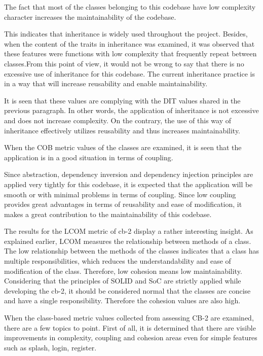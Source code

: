 The fact that most of the classes belonging to this codebase have low complexity character increases the maintainability of the codebase.

This indicates that inheritance is widely used throughout the project.
Besides, when the content of the traits in inheritance was examined, it was observed that these features were functions with low complexity that frequently repeat between classes.From this point of view, it would not be wrong to say that there is no excessive use of inheritance for this codebase. The current inheritance practice is in a way that will increase reusability and enable maintainability.

It is seen that these values are complying with the DIT values shared in the previous paragraph. In other words, the application of inheritance is not excessive and does not increase complexity. On the contrary, the use of this way of inheritance effectively utilizes reusability and thus increases maintainability.

When the COB metric values of the classes are examined, it is seen that the application is in a good situation in terms of coupling. 

Since abstraction, dependency inversion and dependency injection principles are applied very tightly for this codebase, it is expected that the application will be smooth or with minimal problems in terms of coupling. Since low coupling provides great advantages in terms of reusability and ease of modification, it makes a great contribution to the maintainability of this codebase.

The results for the LCOM metric of cb-2 display a rather interesting insight.
As explained earlier, LCOM measures the relationship between methods of a class. The low relationship between the methods of the classes indicates that a class has multiple responsibilities, which reduces the understandability and ease of modification of the class. Therefore, low cohesion means low maintainability. Considering that the principles of SOLID and SoC are strictly applied while developing the cb-2, it should be considered normal that the classes are concise and have a single responsibility. Therefore the cohesion values are also high. 

When the class-based metric values collected from assessing CB-2 are examined, there are a few topics to point. First of all, it is determined that there are visible improvements in complexity, coupling and cohesion areas even for simple features such as splash, login, register. 

